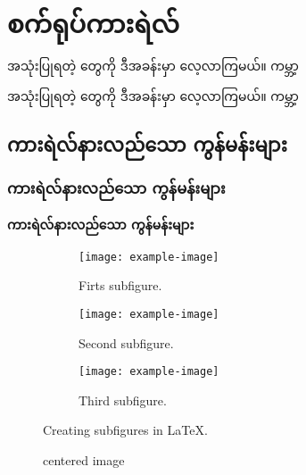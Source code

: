 \chapter{  စက်ရုပ်ကားရဲလ်}
\begin{sloppypar}
    အသုံးပြုရတဲ့  \color{tungsten} တွေကို  ဒီအခန်းမှာ ‌လေ့လာကြမယ်။ ကမ္ဘာ့

    အသုံးပြုရတဲ့  \color{tungsten} တွေကို  ဒီအခန်းမှာ ‌လေ့လာကြမယ်။ ကမ္ဘာ့

\end{sloppypar}

\section{ ကားရဲလ်နားလည်သော ကွန်မန်းများ }


\subsection{ ကားရဲလ်နားလည်သော ကွန်မန်းများ }
\subsubsection{ ကားရဲလ်နားလည်သော ကွန်မန်းများ }



\begin{figure}
\centering
\begin{subfigure}{0.4\textwidth}
    \texttt{[image: example-image]}
    \caption{Firts subfigure.}
    \label{fig:first}
\end{subfigure}
\hfill
\begin{subfigure}{0.4\textwidth}
    \texttt{[image: example-image]}
    \caption{Second subfigure.}
    \label{fig:second}
\end{subfigure}
\hfill
\begin{subfigure}{0.4\textwidth}
    \texttt{[image: example-image]}
    \caption{Third subfigure.}
    \label{fig:third}
\end{subfigure}
        
\caption{Creating subfigures in \LaTeX.}
\label{fig:figures}
\end{figure}

\begin{figure}
    \caption{centered image}
\end{figure}

\noindent{}

\afterpage{\blankpage}
